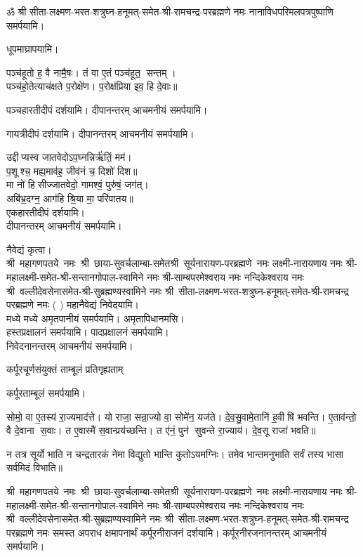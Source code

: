 \begin{center}
ॐ श्री सीता-लक्ष्मण-भरत-शत्रुघ्न-हनूमत्-समेत-श्री-रामचन्द्र-परब्रह्मणे नमः नानाविधपरिमलपत्रपुष्पाणि समर्पयामि। \medskip

\newcommand{\swamine}{श्री~महागणपतये~नमः~श्री~छाया-सुवर्चलाम्बा-समेत\-श्री~सूर्यनारायण-परब्रह्मणे~नमः लक्ष्मी-नारायणाय नमः श्री-महालक्ष्मी-समेत-श्री-सन्तानगोपाल-स्वामिने नमः श्री-साम्बपरमेश्वराय नमः नन्दिकेश्वराय नमः श्री~वल्लीदेवसेनासमेत-श्री-सुब्रह्मण्यस्वामिने नमः श्री~सीता-लक्ष्मण-भरत-शत्रुघ्न-हनूमत्-समेत-श्री-रामचन्द्र परब्रह्मणे नमः}

धूपमाघ्रापयामि।\medskip

पञ्च॑हूतो ह॒ वै नामै॒षः। तं वा ए॒तं पञ्च॑हूत॒ सन्तम्।\\
पञ्च॑हो॒तेत्याच॑क्षते प॒रोक्षे॑ण। प॒रोक्ष॑प्रिया इव॒ हि दे॒वाः॥

पञ्चहारतीदीपं दर्शयामि। दीपानन्तरम् आचमनीयं समर्पयामि।\medskip

गायत्रीदीपं दर्शयामि। दीपानन्तरम् आचमनीयं समर्पयामि।\medskip

उद्दीप्यस्व जातवेदोऽप॒घ्नन्निर्ऋ॑तिं॒ मम॑।\\
प॒शूश्च॒ मह्य॒माव॑ह॒ जीव॑नं च॒ दिशो॑ दिश॥ \\
मा नो॑ हिसीज्जातवेदो॒ गामश्वं॒ पुरु॑षं॒ जग॑त्।\\
अबि॑भ्र॒दग्न॒ आग॑हि श्रि॒या मा॒ परि॑पातय॥ \\
एकहारतीदीपं दर्शयामि।\\
दीपानन्तरम् आचमनीयं समर्पयामि।\medskip

नैवेद्यं कृत्वा।\\
\swamine{} ( ) महानैवेद्यं निवेदयामि।\\
मध्ये मध्ये अमृतपानीयं समर्पयामि। अमृतापिधानमसि।\\
हस्तप्रक्षालनं समर्पयामि। पादप्रक्षालनं समर्पयामि।\\
निवेदनानन्तरम् आचमनीयं समर्पयामि।\medskip

{कर्पूरचूर्णसंयुक्तं ताम्बूलं प्रतिगृह्यताम्}

कर्पूरताम्बूलं समर्पयामि।\medskip

सोमो॒ वा ए॒तस्य॑ रा॒ज्यमाद॑त्ते।
यो राजा॒ सन्रा॒ज्यो वा॒ सोमे॑न॒ यज॑ते।
दे॒व॒सु॒वामे॒तानि॑ ह॒वीषि॑ भवन्ति।
ए॒ताव॑न्तो॒ वै दे॒वाना स॒वाः।
त ए॒वास्मै॑ स॒वान्प्रय॑च्छन्ति।
त ए॑नं॒ पुन॑ सुवन्ते रा॒ज्याय॑।
दे॒व॒सू राजा॑ भवति॥

न तत्र सूर्यो भाति न चन्द्रतारकं नेमा विद्युतो भान्ति कुतोऽयमग्निः।
तमेव भान्तमनुभाति सर्वं तस्य भासा सर्वमिदं विभाति॥


\swamine{} समस्त अपराध क्षमापनार्थं कर्पूरनीराजनं दर्शयामि। कर्पूरनीरजनानन्तरम् आचमनीयं समर्पयामि।\medskip



\end{center}
